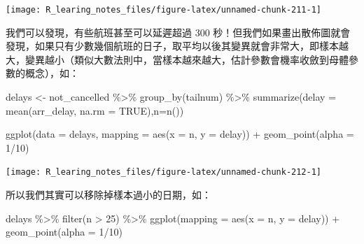 \documentclass[
]{book}
\newenvironment{Shaded}{\begin{snugshade}}{\end{snugshade}}
\newcommand{\AttributeTok}[1]{\textcolor[rgb]{0.77,0.63,0.00}{#1}}
\newcommand{\ConstantTok}[1]{\textcolor[rgb]{0.00,0.00,0.00}{#1}}
\newcommand{\DecValTok}[1]{\textcolor[rgb]{0.00,0.00,0.81}{#1}}
\newcommand{\FunctionTok}[1]{\textcolor[rgb]{0.00,0.00,0.00}{#1}}
\newcommand{\NormalTok}[1]{#1}
\newcommand{\OtherTok}[1]{\textcolor[rgb]{0.56,0.35,0.01}{#1}}
\newcommand{\SpecialCharTok}[1]{\textcolor[rgb]{0.00,0.00,0.00}{#1}}
\theoremstyle{definition}
\theoremstyle{remark}
\begin{document}
\begin{center}\texttt{[image: R\_learing\_notes\_files/figure-latex/unnamed-chunk-211-1]} \end{center}

我們可以發現，有些航班甚至可以延遲超過 300 秒！但我們如果畫出散佈圖就會發現，如果只有少數幾個航班的日子，取平均以後其變異就會非常大，即樣本越大，變異越小（類似大數法則中，當樣本越來越大，估計參數會機率收斂到母體參數的概念），如：

\begin{Shaded}
\begin{Highlighting}[]
\NormalTok{delays }\OtherTok{\textless{}{-}}\NormalTok{ not\_cancelled }\SpecialCharTok{\%\textgreater{}\%}
  \FunctionTok{group\_by}\NormalTok{(tailnum) }\SpecialCharTok{\%\textgreater{}\%}
  \FunctionTok{summarize}\NormalTok{(}\AttributeTok{delay =} \FunctionTok{mean}\NormalTok{(arr\_delay, }\AttributeTok{na.rm =} \ConstantTok{TRUE}\NormalTok{),}\AttributeTok{n=}\FunctionTok{n}\NormalTok{())}

\FunctionTok{ggplot}\NormalTok{(}\AttributeTok{data =}\NormalTok{ delays, }\AttributeTok{mapping =} \FunctionTok{aes}\NormalTok{(}\AttributeTok{x =}\NormalTok{ n, }\AttributeTok{y =}\NormalTok{ delay)) }\SpecialCharTok{+}
  \FunctionTok{geom\_point}\NormalTok{(}\AttributeTok{alpha =} \DecValTok{1}\SpecialCharTok{/}\DecValTok{10}\NormalTok{)}
\end{Highlighting}
\end{Shaded}

\begin{center}\texttt{[image: R\_learing\_notes\_files/figure-latex/unnamed-chunk-212-1]} \end{center}

所以我們其實可以移除掉樣本過小的日期，如：

\begin{Shaded}
\begin{Highlighting}[]
\NormalTok{delays }\SpecialCharTok{\%\textgreater{}\%}
  \FunctionTok{filter}\NormalTok{(n }\SpecialCharTok{\textgreater{}} \DecValTok{25}\NormalTok{) }\SpecialCharTok{\%\textgreater{}\%}
  \FunctionTok{ggplot}\NormalTok{(}\AttributeTok{mapping =} \FunctionTok{aes}\NormalTok{(}\AttributeTok{x =}\NormalTok{ n, }\AttributeTok{y =}\NormalTok{ delay)) }\SpecialCharTok{+} \FunctionTok{geom\_point}\NormalTok{(}\AttributeTok{alpha =} \DecValTok{1}\SpecialCharTok{/}\DecValTok{10}\NormalTok{)}
\end{Highlighting}
\end{Shaded}
\end{document}
